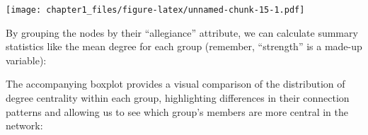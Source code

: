 \documentclass[
]{book}
\newenvironment{Shaded}{\begin{snugshade}}{\end{snugshade}}
\newcommand{\AttributeTok}[1]{\textcolor[rgb]{0.13,0.29,0.53}{#1}}
\newcommand{\CommentTok}[1]{\textcolor[rgb]{0.56,0.35,0.01}{\textit{#1}}}
\newcommand{\DecValTok}[1]{\textcolor[rgb]{0.00,0.00,0.81}{#1}}
\newcommand{\FunctionTok}[1]{\textcolor[rgb]{0.13,0.29,0.53}{\textbf{#1}}}
\newcommand{\NormalTok}[1]{#1}
\newcommand{\SpecialCharTok}[1]{\textcolor[rgb]{0.81,0.36,0.00}{\textbf{#1}}}
\begin{document}
\texttt{[image: chapter1\_files/figure-latex/unnamed-chunk-15-1.pdf]}

By grouping the nodes by their ``allegiance'' attribute, we can calculate summary statistics like the mean degree for each group (remember, ``strength'' is a made-up variable):

\begin{Shaded}
\end{Shaded}

The accompanying boxplot provides a visual comparison of the distribution of degree centrality within each group, highlighting differences in their connection patterns and allowing us to see which group's members are more central in the network:
\end{document}
